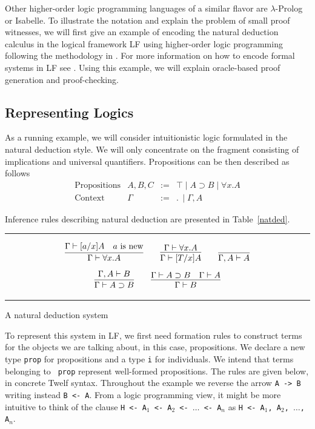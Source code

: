 \documentclass{acmconf}
\newcommand{\figfoot}{\vspace{1ex}\hrule}
\newcommand{\fighead}{\hrule\vspace{1.5ex}}
\newcommand{\impl}{\supset}
\newcommand{\ldot}{.\,}
\begin{document}
Other higher-order logic programming languages of a similar
flavor are $\lambda$-Prolog \cite{Nadathur99cade} or
Isabelle\cite{Paulson86}. To illustrate the notation and explain the
problem of small proof witnesses, we will first give an example of
encoding the natural deduction calculus in the logical framework LF
using higher-order logic programming following the methodology in
\cite{Harper93jacm}. For more information on how to encode formal
systems in LF see \cite{Pfenning97}.  Using this example, we will
explain oracle-based proof generation and proof-checking.  

\subsection{Representing Logics}
As a running example, we will consider intuitionistic logic formulated
in the natural deduction style. We will only concentrate on the fragment
consisting of implications and universal quantifiers. Propositions can
be then described as follows
\[
\begin{array}{llll}
\mbox{Propositions} & A,B, C & := & \top \mid A \impl B \mid \forall x.A \\
\mbox{Context} & \Gamma & := & \ldot \mid \Gamma,  A
\end{array}
\]

Inference rules describing natural deduction are presented in Table~\ref{natded}.

\begin{table}[h]
\fighead
\[
\infer{\Gamma\vdash \forall x. A}
{\Gamma\vdash [a/x]A & a \mbox{ is new}}
\qquad
\infer{\Gamma\vdash [T/x]A}
{\Gamma\vdash \forall x.A}
\qquad
\infer{\Gamma, A \vdash A}
{}
\]
\[
\infer{\Gamma\vdash A\impl B}
{\Gamma,A\vdash B}
\qquad
\infer{\Gamma\vdash B}
{\Gamma\vdash A\impl B
\quad
\Gamma\vdash A}
\]
\figfoot
\caption{\label{natded}A natural deduction system}
\end{table}

To represent this system in LF, we first need formation rules to
construct terms for the objects we are talking about, in this case,
propositions. We declare a new type {\tt prop} for propositions and a
type {\tt i} for individuals. We intend that terms belonging to {\tt
  prop} represent well-formed propositions. The rules are given below,
in concrete Twelf syntax. Throughout the example we reverse the arrow {\tt{A -> B}} writing instead {\tt{B <- A}}. From a logic programming view, it might be more intuitive to think of the clause {\tt{H <- A$_1$ <- A$_2$ <- $\ldots$ <- A$_n$}} as {\tt{H <- A$_1$, A$_2$, $\ldots$, A$_n$}}.
\end{document}
